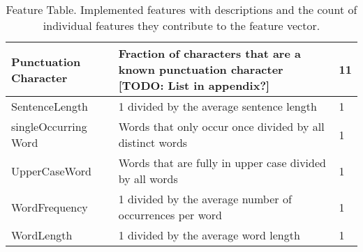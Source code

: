 \begin{table}[h]
\begin{center}
\begin{tabular}{p{2.6cm}|p{8.2cm}|p{1.2cm}}
    Punctuation Character	& Fraction of characters that are a known punctuation character [TODO: List in appendix?]
                                                                                                            & 11				\\ \hline
    SentenceLength			& 1 divided by the average sentence length										& 1 				\\ \hline
    singleOccurring Word	& Words that only occur once divided by all distinct words						& 1					\\ \hline
    UpperCaseWord			& Words that are fully in upper case divided by all words						& 1					\\ \hline
    WordFrequency			& 1 divided by the average number of occurrences per word						& 1					\\ \hline
    WordLength				& 1 divided by the average word length											& 1					\\
    \end{tabular}
    \end{center}
	\caption{Feature Table. Implemented features with descriptions and the count of individual features they contribute to the feature vector.}
	\label{tab:featureTable}
\end{table}
